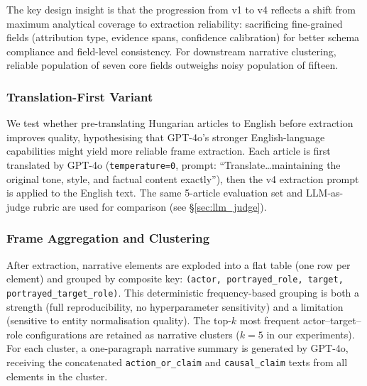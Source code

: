 \documentclass[10pt, a4paper]{article}
\begin{document}

The key design insight is that the progression from v1 to v4 reflects a shift from maximum analytical coverage to extraction reliability: sacrificing fine-grained fields (attribution type, evidence spans, confidence calibration) for better schema compliance and field-level consistency. For downstream narrative clustering, reliable population of seven core fields outweighs noisy population of fifteen.

\subsubsection{Translation-First Variant}
\label{sec:translation_variant}

We test whether pre-translating Hungarian articles to English before extraction improves quality, hypothesising that GPT-4o's stronger English-language capabilities might yield more reliable frame extraction. Each article is first translated by GPT-4o (\texttt{temperature=0}, prompt: ``Translate\ldots maintaining the original tone, style, and factual content exactly''), then the v4 extraction prompt is applied to the English text. The same 5-article evaluation set and LLM-as-judge rubric are used for comparison (see \S\ref{sec:llm_judge}).


\subsubsection{Frame Aggregation and Clustering}
\label{sec:clustering}

After extraction, narrative elements are exploded into a flat table (one row per element) and grouped by composite key: \texttt{(actor, portrayed\_role, target, portrayed\_target\_role)}. This deterministic frequency-based grouping is both a strength (full reproducibility, no hyperparameter sensitivity) and a limitation (sensitive to entity normalisation quality). The top-$k$ most frequent actor--target--role configurations are retained as narrative clusters ($k=5$ in our experiments). For each cluster, a one-paragraph narrative summary is generated by GPT-4o, receiving the concatenated \texttt{action\_or\_claim} and \texttt{causal\_claim} texts from all elements in the cluster.
\end{document}
